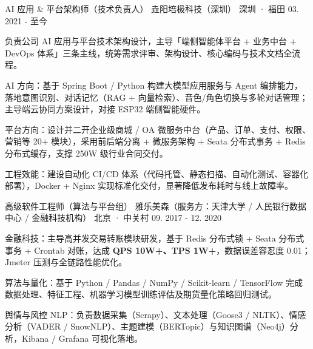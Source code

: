 
\begin{cventries}

  \cventry
    {AI 应用 \& 平台架构师（技术负责人）} %
    {垚阳培极科技（深圳）} %
    {深圳 · 福田} %
    {03. 2021 - 至今} %
    {
      \begin{cvitems}
        \item {负责公司 AI 应用与平台技术架构设计，主导「端侧智能体平台 + 业务中台 + DevOps 体系」三条主线，统筹需求评审、架构设计、核心编码与技术文档全流程。}
        \item {AI 方向：基于 Spring Boot / Python 构建大模型应用服务与 Agent 编排能力，落地意图识别、对话记忆（RAG + 向量检索）、音色/角色切换与多轮对话管理；主导端云协同方案设计，对接 ESP32 端侧智能硬件。}
        \item {平台方向：设计并二开企业级商城 / OA 微服务中台（产品、订单、支付、权限、营销等 20+ 模块），采用前后端分离 + 微服务架构 + Seata 分布式事务 + Redis 分布式缓存，支撑 250W 级行业合同交付。}
        \item {工程效能：建设自动化 CI/CD 体系（代码托管、静态扫描、自动化测试、容器化部署），Docker + Nginx 实现标准化交付，显著降低发布耗时与线上故障率。}
      \end{cvitems}
    }

  \vspace{3mm}
  \cventry
    {高级软件工程师（算法与平台组）} %
    {雅乐美森（服务方：天津大学 / 人民银行数据中心 / 金融科技机构）} %
    {北京 · 中关村} %
    {09. 2017 - 12. 2020} %
    {
      \begin{cvitems}
        \item {金融科技：主导高并发交易转账模块研发，基于 Redis 分布式锁 + Seata 分布式事务 + Crontab 对账，达成 \textbf{QPS 10W+、TPS 1W+}，数据误差容忍度 0.01；Jmeter 压测与全链路性能优化。}
        \item {算法与量化：基于 Python / Pandas / NumPy / Scikit-learn / TensorFlow 完成数据处理、特征工程、机器学习模型训练评估及期货量化策略回归测试。}
        \item {舆情与风控 NLP：负责数据采集（Scrapy）、文本处理（Goose3 / NLTK）、情感分析（VADER / SnowNLP）、主题建模（BERTopic）与知识图谱（Neo4j）分析，Kibana / Grafana 可视化落地。}
      \end{cvitems}
    }

\end{cventries}
\vspace{3mm}

